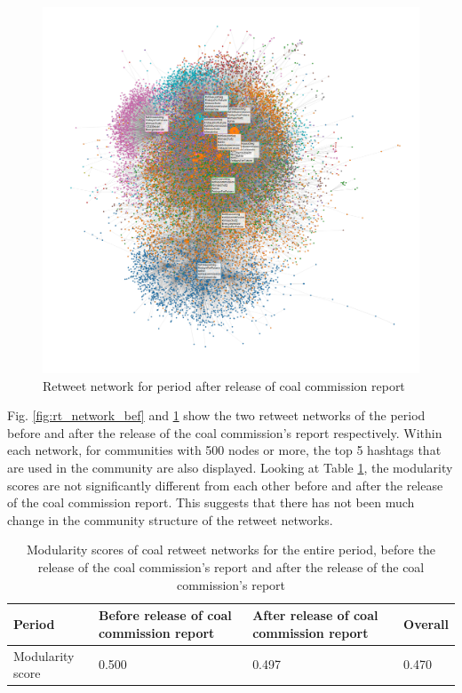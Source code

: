 \documentclass[12pt,onecolumn,twoside]{layout}
\begin{document}
\begin{figure} 
	\begin{center}
		\includegraphics[width=0.8\linewidth]{figures/rt_network_ht_period3}
	\end{center}
	\caption{Retweet network for period after release of coal commission report}
	\label{fig:rt_network_aft}
\end{figure}

Fig. \ref{fig:rt_network_bef} and \ref{fig:rt_network_aft} show the two retweet networks of the period before and after the release of the coal commission's report respectively. Within each network, for communities with 500 nodes or more, the top 5 hashtags that are used in the community are also displayed. Looking at Table \ref{table:rt_network_mod}, the modularity scores are not significantly different from each other before and after the release of the coal commission report. This suggests that there has not been much change in the community structure of the retweet networks. 



\begin{table}[htbp]
\begin{center}
	\caption{Modularity scores of coal retweet networks for the entire period, before the release of the coal commission's report and after the release of the coal commission's report}
	\label{table:rt_network_mod}
	\begin{tabular}{| l | p{2.5cm} | p{2.5cm} | l |}
		\hline
		Period & Before release of coal commission report & After release of coal commission report & Overall \\ \hline
		Modularity score & 0.500 & 0.497 & 0.470 \\ \hline
	\end{tabular}
\end{center}
\end{table}
\end{document}
